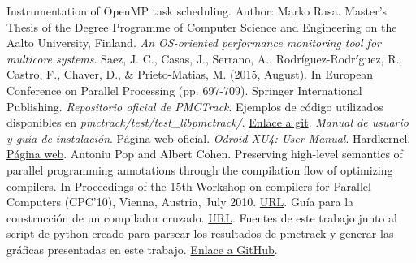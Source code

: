 \begin{thebibliography}{1}
 Instrumentation of OpenMP task scheduling. Author: Marko Rasa. Master's Thesis of the Degree Programme of Computer Science and Engineering on the Aalto University, Finland.
\textit{An OS-oriented performance monitoring tool for multicore systems}. Saez, J. C., Casas, J., Serrano, A., Rodríguez-Rodríguez, R., Castro, F., Chaver, D., \& Prieto-Matias, M. (2015, August). In European Conference on Parallel Processing (pp. 697-709). Springer International Publishing.
 \textit{Repositorio oficial de PMCTrack}. Ejemplos de código utilizados disponibles en \textit{pmctrack/test/test\_libpmctrack/}. \href{https://github.com/jcsaezal/pmctrack}{Enlace a git}.
 \textit{Manual de usuario y guía de instalación}. \href{https://pmctrack.dacya.ucm.es/getting-started/}{Página web oficial}.
 \textit{Odroid XU4: User Manual}. Hardkernel. \href{http://magazine.odroid.com/odroid-xu4/}{Página web}.
Antoniu Pop and Albert Cohen. Preserving high-level semantics of parallel programming annotations through the compilation flow of optimizing compilers. In Proceedings of the 15th Workshop on compilers for Parallel Computers (CPC’10), Vienna, Austria, July 2010. \href{https://hal.inria.fr/inria-00551518}{URL}.
Guía para la construcción de un compilador cruzado. \href{http://preshing.com/20141119/how-to-build-a-gcc-cross-compiler/}{URL}.
Fuentes de este trabajo junto al script de python creado para parsear los resultados de pmctrack y generar las gráficas presentadas en este trabajo. \href{https://github.com/mizadri/LaTeX/tree/master/openmp-runtime}{Enlace a GitHub}.

\end{thebibliography}

